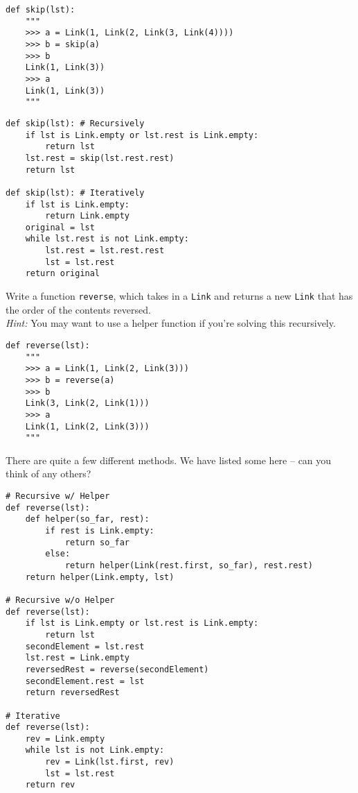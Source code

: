 \documentclass{exam}
\begin{document}
\begin{questions}
\begin{blocksection}
\begin{lstlisting}
def skip(lst):
    """
    >>> a = Link(1, Link(2, Link(3, Link(4))))
    >>> b = skip(a)
    >>> b
    Link(1, Link(3))
    >>> a
    Link(1, Link(3))
    """
\end{lstlisting}

\begin{solution}[1in]
\begin{lstlisting}
def skip(lst): # Recursively
    if lst is Link.empty or lst.rest is Link.empty:
        return lst
    lst.rest = skip(lst.rest.rest)
    return lst

def skip(lst): # Iteratively
    if lst is Link.empty:
        return Link.empty
    original = lst
    while lst.rest is not Link.empty:
        lst.rest = lst.rest.rest
        lst = lst.rest
    return original
\end{lstlisting}
\end{solution}

\end{blocksection}

\begin{blocksection}
\question Write a function \texttt{reverse}, which takes in a \texttt{Link} and
returns a new \texttt{Link} that has the order of the contents reversed.\\
\emph{Hint:} You may want to use a helper function if you're solving this
recursively.
\begin{lstlisting}
def reverse(lst):
    """
    >>> a = Link(1, Link(2, Link(3)))
    >>> b = reverse(a)
    >>> b
    Link(3, Link(2, Link(1)))
    >>> a
    Link(1, Link(2, Link(3)))
    """
\end{lstlisting}

\begin{solution}[1in]
There are quite a few different methods. We have listed some here -- can you
think of any others?
\begin{lstlisting}
# Recursive w/ Helper
def reverse(lst):
    def helper(so_far, rest):
        if rest is Link.empty:
            return so_far
        else:
            return helper(Link(rest.first, so_far), rest.rest)
    return helper(Link.empty, lst)

# Recursive w/o Helper
def reverse(lst):
    if lst is Link.empty or lst.rest is Link.empty:
        return lst
    secondElement = lst.rest
    lst.rest = Link.empty
    reversedRest = reverse(secondElement)
    secondElement.rest = lst
    return reversedRest

# Iterative
def reverse(lst):
    rev = Link.empty
    while lst is not Link.empty:
        rev = Link(lst.first, rev)
        lst = lst.rest
    return rev
\end{lstlisting}
\end{solution}


\end{blocksection}
\end{questions}
\end{document}
